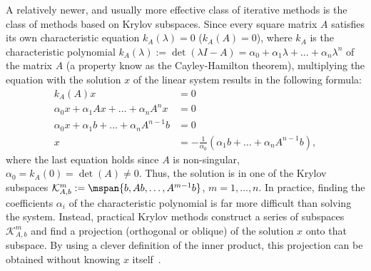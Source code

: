 A relatively newer, and usually more effective class of iterative methods is the
class of methods based on Krylov subspaces. Since every square matrix
$A$ satisfies its own characteristic equation $k_A(\lambda) = 0$ (\ie $k_A(A) =
0$), where $k_A$ is the characteristic polynomial $k_A(\lambda) := \det(\lambda
I - A) = \alpha_0 + \alpha_1 \lambda + \ldots + \alpha_n \lambda^n$ of the
matrix $A$ (a property know as the Cayley-Hamilton theorem), multiplying the
equation with the solution $x$ of the linear system results in the following
formula:
\begin{align}
    k_A(A)x &= 0\\
    \alpha_0 x + \alpha_1 Ax + \ldots + \alpha_n A^n x &= 0\\
    \alpha_0 x + \alpha_1 b + \ldots + \alpha_n A^{n-1} b &= 0\\
    x &= -\frac{1}{\alpha_0}(\alpha_1 b + \ldots + \alpha_n A^{n-1}b),
\end{align}
where the last equation holds since $A$ is non-singular, \ie $\alpha_0 = k_A(0)
= \det(A) \neq 0$. Thus, the solution is in one of the Krylov subspaces
$\mathcal{K}_{A, b}^m := \mspan\{b, Ab, \ldots, A^{m-1}b\}$, $m = 1, \ldots, n$.
In practice, finding the coefficients $\alpha_i$ of the characteristic
polynomial is far more difficult than solving the system. Instead, practical
Krylov methods construct a series of subspaces $\mathcal{K}_{A,b}^m$ and find a
projection (orthogonal or oblique) of the solution $x$ onto that subspace. By
using a clever definition of the inner product, this projection can be
obtained without knowing $x$ itself~\cite{demmel,saad}.


